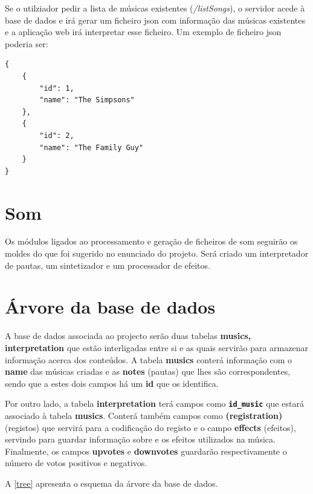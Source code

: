 \documentclass{report}
\begin{document}
Se o utilziador pedir a lista de músicas existentes (\emph{/listSongs}), o servidor acede à base de dados e irá gerar um ficheiro \ac{json} com informação das músicas existentes e a aplicação web irá interpretar esse ficheiro. Um exemplo de ficheiro \ac{json} poderia ser:

\begin{lstlisting}
{
    {
        "id": 1,
        "name": "The Simpsons"
    },
    {
        "id": 2,
        "name": "The Family Guy"
    }
}
\end{lstlisting}

\chapter{Som}
\label{chap.som}

Os módulos ligados ao processamento e geração de ficheiros de som seguirão os moldes do que foi sugerido no enunciado do projeto. Será criado um interpretador de pautas, um sintetizador e um processador de efeitos.

\chapter{Árvore da base de dados}
\label{chap.base}

A base de dados associada ao projecto serão duas tabelas \textbf{musics, interpretation} que estão interligadas entre si e as quais servirão para armazenar informação acerca dos conteúdos.
A tabela \textbf{musics} conterá informação com o \textbf{name} das músicas criadas e as \textbf{notes} (pautas) que lhes são correspondentes, sendo que a estes dois campos há um \textbf{id} que os identifica.

Por outro lado, a tabela \textbf{interpretation} terá campos como
\textbf{\texttt{id\_music}} que estará associado à tabela \textbf{musics}. Conterá também campos como \textbf{(registration)} (registos) que servirá para a codificação do registo  e o campo \textbf{effects} (efeitos), servindo para guardar informação sobre e os efeitos utilizados na música.
Finalmente, os campos \textbf{upvotes} e \textbf{downvotes} guardarão respectivamente o número de votos positivos e negativos. 


A \autoref{tree} apresenta o esquema da árvore da base de dados.
\end{document}
